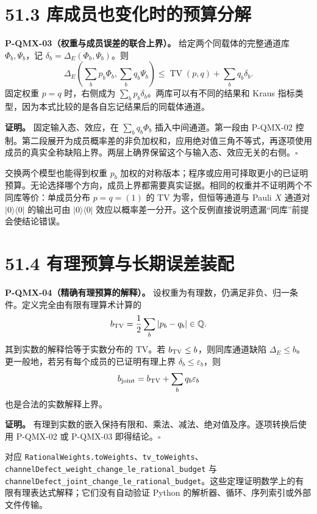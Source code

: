 \documentclass[
  11pt,
  oneside]{book}
\begin{document}
\section{51.3 库成员也变化时的预算分解}

\protect\hypertarget{p-qmx-03}{}{}

\textbf{P-QMX-03（权重与成员误差的联合上界）。}
给定两个同载体的完整通道库 \(\Phi_b,\Psi_b\)，记
\(\delta_b=\Delta_E(\Phi_b,\Psi_b)\)。则 \[
\Delta_E\left(\sum_b p_b\Phi_b,\sum_b q_b\Psi_b\right)
\le\operatorname{TV}(p,q)+\sum_b q_b\delta_b.
\] 固定权重 \(p=q\) 时，右侧成为
\(\sum_b p_b\delta_b\)。两库可以有不同的结果和 Kraus
指标类型，因为本式比较的是各自忘记结果后的同载体通道。

\textbf{证明。} 固定输入态、效应，在 \(\sum_b q_b\Phi_b\)
插入中间通道。第一段由 P-QMX-02
控制。第二段展开为成员概率差的非负加权和，应用绝对值三角不等式，再逐项使用成员的真实全称缺陷上界。两层上确界保留这个与输入态、效应无关的右侧。\(\square\)

交换两个模型也能得到权重 \(p_b\)
加权的对称版本；程序或应用可择取更小的已证明预算。无论选择哪个方向，成员上界都需要真实证据。相同的权重并不证明两个不同库等价：单成员分布
\(p=q=(1)\) 的 TV 为零，但恒等通道与 Pauli \(X\) 通道对
\(|0\rangle\langle0|\) 的输出可由 \(|0\rangle\langle0|\)
效应以概率差一分开。这个反例直接说明遗漏``同库''前提会使结论错误。

\section{51.4 有理预算与长期误差装配}

\protect\hypertarget{p-qmx-04}{}{}

\textbf{P-QMX-04（精确有理预算的解释）。}
设权重为有理数，仍满足非负、归一条件。定义完全由有限有理算术计算的 \[
b_{\rm TV}=\frac12\sum_b|p_b-q_b|\in\mathbb Q.
\] 其到实数的解释恰等于实数分布的 TV。若
\(b_{\rm TV}\le b\)，则同库通道缺陷
\(\Delta_E\le b\)。更一般地，若另有每个成员的已证明有理上界
\(\delta_b\le\varepsilon_b\)，则 \[
b_{\rm joint}=b_{\rm TV}+\sum_b q_b\varepsilon_b
\] 也是合法的实数解释上界。

\textbf{证明。}
有理到实数的嵌入保持有限和、乘法、减法、绝对值及序。逐项转换后使用
P-QMX-02 或 P-QMX-03 即得结论。\(\square\)

对应
\texttt{Rational\allowbreak Weights.\allowbreak to\allowbreak Weights}、\allowbreak \texttt{tv\_\allowbreak to\allowbreak Weights}、\allowbreak \texttt{channel\allowbreak Defect\_\allowbreak weight\_\allowbreak change\_\allowbreak le\_\allowbreak rational\_\allowbreak budget}
与
\texttt{channel\allowbreak Defect\_\allowbreak joint\_\allowbreak change\_\allowbreak le\_\allowbreak rational\_\allowbreak budget}。这些定理证明数学上的有限有理表达式解释；它们没有自动验证
Python 的解析器、循环、序列索引或外部文件传输。
\end{document}
